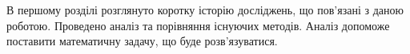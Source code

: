 В першому розділі розглянуто коротку історію досліджень,
що пов'язані з даною роботою.
Проведено аналіз та порівняння існуючих методів.
Аналіз допоможе поставити математичну задачу, що буде розв'язуватися.
